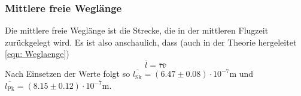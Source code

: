 \subsubsection{Mittlere freie Weglänge}

Die mittlere freie Weglänge ist die Strecke, die in der mittleren Flugzeit
zurückgelegt wird. Es ist also anschaulich, dass (auch in der Theorie hergeleitet \eqref{eqn: Weglaenge}) 
\begin{equation*}
\bar{l} = \bar{ \tau } \bar{v}
\end{equation*}
Nach Einsetzen der Werte folgt so $\bar{l_\text{Sk}} = \left( 6.47 \pm 0.08 \right) \cdot 10^{-7} \si{\m}$
und $\bar{l_\text{Pk}} = \left( 8.15 \pm 0.12 \right) \cdot 10^{-7} \si{\m}$.

